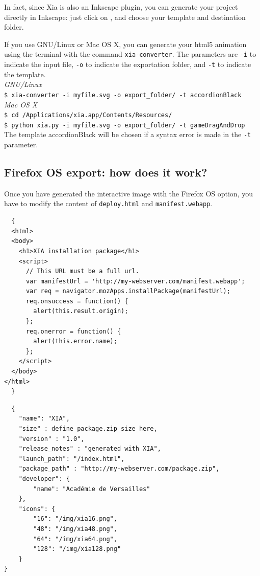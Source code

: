 In fact, since Xia is also an Inkscape plugin, you can generate your project directly 
in Inkscape: just click on , 
and choose your template and destination folder.

\begin{tip}
 If you use GNU/Linux or Mac OS X, you can generate your html5 animation
 using the terminal with the command \texttt{xia-converter}. The parameters are
 \texttt{-i} to indicate the input file, \texttt{-o} to indicate the exportation folder, and
 \texttt{-t} to indicate the template.\\
 \emph{GNU/Linux}\\
 \texttt{\$ xia-converter -i myfile.svg -o export\_folder/ -t accordionBlack}\\
 \emph{Mac OS X}\\
 \texttt{\$ cd /Applications/xia.app/Contents/Resources/}\\
 \texttt{\$ python xia.py -i myfile.svg -o export\_folder/ -t gameDragAndDrop}\\
 The template accordionBlack will be chosen if a syntax error is made in the \texttt{-t} parameter.
\end{tip}

\subsection{Firefox OS export: how does it work?}

Once you have generated the interactive image with the Firefox OS option, you have to modify the content of 
\texttt{deploy.html} and \texttt{manifest.webapp}.

 \begin{verbatim}
  {
  <html>
  <body>
    <h1>XIA installation package</h1>
    <script>
      // This URL must be a full url.
      var manifestUrl = 'http://my-webserver.com/manifest.webapp';
      var req = navigator.mozApps.installPackage(manifestUrl);
      req.onsuccess = function() {
        alert(this.result.origin);
      };
      req.onerror = function() {
        alert(this.error.name);
      };
    </script>
  </body>
</html>
  }
 \end{verbatim}

 \begin{verbatim}
  { 
    "name": "XIA",
    "size" : define_package.zip_size_here,
    "version" : "1.0",
    "release_notes" : "generated with XIA", 
    "launch_path": "/index.html",
    "package_path" : "http://my-webserver.com/package.zip",
    "developer": {
        "name": "Académie de Versailles"
    },
    "icons": { 
        "16": "/img/xia16.png",
        "48": "/img/xia48.png",
        "64": "/img/xia64.png",
        "128": "/img/xia128.png" 
    }
}
 \end{verbatim}

